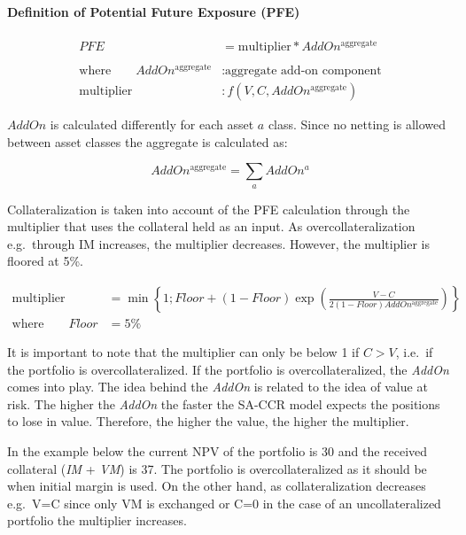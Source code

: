     \hypertarget{definition-of-potential-future-exposure-pfe}{%
\paragraph{Definition of Potential Future Exposure
(PFE)}\label{definition-of-potential-future-exposure-pfe}}

\begin{align*}
PFE &= \text{multiplier} * AddOn^{\text{aggregate}} \\
\\
\text{where} \qquad AddOn^{\text{aggregate}} &: \text{aggregate add-on component} \\
\text{multiplier} &: f(V,C,AddOn^{\text{aggregate}})
\end{align*}

\(AddOn\) is calculated differently for each asset \(a\) class. Since no
netting is allowed between asset classes the aggregate is calculated as:

\[AddOn^{\text{aggregate}} = \sum_{a}AddOn^{a}\]

Collateralization is taken into account of the PFE calculation through
the multiplier that uses the collateral held as an input. As
overcollateralization e.g.~through IM increases, the multiplier
decreases. However, the multiplier is floored at 5\%.

\begin{align*}
\text{multiplier} &= \min \left\{ 1; Floor + (1-Floor) \exp\left(\frac{V-C}{2(1-Floor)AddOn^{\text{aggregate}}}\right) \right\} \\
\text{where} \qquad Floor &= 5\%
\end{align*}

It is important to note that the multiplier can only be below 1 if
\(C>V\), i.e.~if the portfolio is overcollateralized. If the portfolio
is overcollateralized, the \emph{AddOn} comes into play. The idea behind
the \emph{AddOn} is related to the idea of value at risk. The higher the
\emph{AddOn} the faster the SA-CCR model expects the positions to lose
in value. Therefore, the higher the value, the higher the multiplier.

In the example below the current NPV of the portfolio is 30 and the
received collateral (\emph{IM} + \emph{VM}) is 37. The portfolio is
overcollateralized as it should be when initial margin is used. On the
other hand, as collateralization decreases e.g.~V=C since only VM is
exchanged or C=0 in the case of an uncollateralized portfolio the
multiplier increases.


